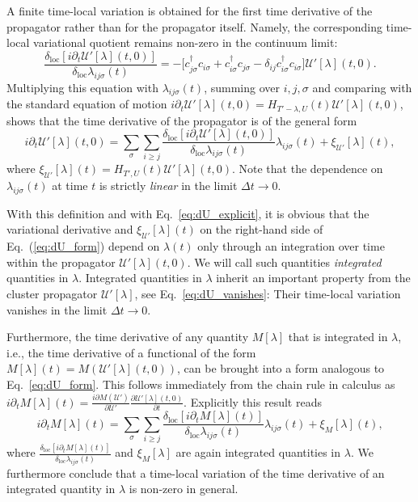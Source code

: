 \documentclass[twocolumn,prb,showpacs,aps,superscriptaddress]{revtex4}
\newcommand{\cds}[1]{\ensuremath{c^\dagger_{#1}}}
\newcommand{\ccs}[1]{\ensuremath{c_{#1}}}
\newcommand{\deltaloc}[0]{\ensuremath{\delta_\mathrm{loc}}}
\begin{document}
A finite time-local variation is obtained for the first time derivative
of the propagator rather than for the propagator itself. 
Namely, the corresponding time-local variational quotient remains
non-zero in the continuum limit:
\begin{equation}
  \label{eq:dU_explicit}
  \frac{\deltaloc [i\partial_t \mathcal{U}'[\lambda](t,0)]}
  {\deltaloc\lambda_{ij\sigma}(t)}
  = 
  -
  \bigl[
    \cds{j\sigma}\ccs{i\sigma } 
    + 
    \cds{i\sigma}\ccs{j\sigma} 
    -
    \delta_{ij}\cds{i\sigma}\ccs{i\sigma}
  \bigr]
  \mathcal{U}'[\lambda](t,0).
\end{equation}
Multiplying this equation with $\lambda_{ij\sigma}(t)$, summing over
$i,j,\sigma$ and comparing with the standard equation of motion $i\partial_t
\mathcal{U}'[\lambda](t,0) = H_{T' - \lambda, U}(t)
\mathcal{U}'[\lambda](t,0)$, shows that the time derivative of the propagator
is of the general form
\begin{equation}
  \label{eq:dU_form}
  i\partial_t \mathcal{U}'[\lambda](t,0)
  =
  \sum_\sigma\sum_{i\ge j}
  \frac{\deltaloc [i\partial_t \mathcal{U}'[\lambda](t,0)]}
  {\delta_\mathrm{loc}\lambda_{ij\sigma}(t)}
  \lambda_{ij\sigma}(t)
  +
  \xi_{\mathcal{U}'}[\lambda](t),
\end{equation}
where $\xi_{\mathcal{U}'}[\lambda](t) = H_{T', U}(t)
\mathcal{U}'[\lambda](t,0)$.
Note that the dependence on $\lambda_{ij\sigma}(t)$ at time $t$ is strictly {\em linear}
in the limit $\Delta t\to 0$.

With this definition and with Eq.\ \eqref{eq:dU_explicit}, it is obvious that 
the variational derivative  and $\xi_{\mathcal{U}'}[\lambda](t)$ on the
right-hand side of Eq.\ (\ref{eq:dU_form}) depend on $\lambda(t)$ only through
an integration over time within the propagator $\mathcal{U}'[\lambda](t,0)$.
We will call such quantities \emph{integrated} quantities in $\lambda$.
Integrated quantities in $\lambda$ inherit an important property from the
cluster propagator $\mathcal{U}'[\lambda]$, see Eq.\ \eqref{eq:dU_vanishes}:
Their time-local variation vanishes in the limit $\Delta t \rightarrow 0$. 

Furthermore, the time derivative of any quantity $M[\lambda]$ that is
integrated in $\lambda$, i.e., the time derivative of a functional of the form
$M[\lambda](t) = M(\mathcal{U}'[\lambda](t,0))$,
can be brought into a form analogous to Eq.\ \eqref{eq:dU_form}. This follows
immediately from the chain rule in calculus as $i\partial_t M[\lambda](t) =
\frac{i\partial M(\mathcal{U}')}{\partial \mathcal{U}'}\frac{\partial
\mathcal{U}'[\lambda](t,0)}{\partial t}$. Explicitly this result reads
\begin{equation}
  \label{eq:dM_form}
  i\partial_t M[\lambda](t)
  =
  \sum_\sigma\sum_{i\ge j}
  \frac{\deltaloc [i\partial_t M[\lambda](t)]}
  {\delta_\mathrm{loc}\lambda_{ij\sigma}(t)}
  \lambda_{ij\sigma}(t)
  +
  \xi_{M}[\lambda](t),
\end{equation}
where $\frac{\deltaloc [i\partial_t M[\lambda](t)]}
{\delta_\mathrm{loc}\lambda_{ij\sigma}(t)}$ and $\xi_M[\lambda]$ are again
integrated quantities in $\lambda$. We furthermore conclude that a time-local
variation of the time derivative of an integrated quantity in $\lambda$ is
non-zero in general.
\end{document}

